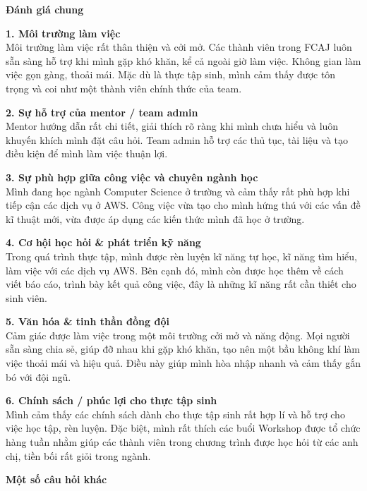 \vspace{0.5em}\noindent\textbf{Đánh giá chung}\par

\textbf{1. Môi trường làm việc}\\
Môi trường làm việc rất thân thiện và cởi mở. Các thành viên trong FCAJ
luôn sẵn sàng hỗ trợ khi mình gặp khó khăn, kể cả ngoài giờ làm việc.
Không gian làm việc gọn gàng, thoải mái. Mặc dù là thực tập sinh, mình
cảm thấy được tôn trọng và coi như một thành viên chính thức của team.

\textbf{2. Sự hỗ trợ của mentor / team admin}\\
Mentor hướng dẫn rất chi tiết, giải thích rõ ràng khi mình chưa hiểu và
luôn khuyến khích mình đặt câu hỏi. Team admin hỗ trợ các thủ tục, tài
liệu và tạo điều kiện để mình làm việc thuận lợi.

\textbf{3. Sự phù hợp giữa công việc và chuyên ngành học}\\
Mình đang học ngành Computer Science ở trường và cảm thấy rất phù hợp
khi tiếp cận các dịch vụ ở AWS. Công việc vừa tạo cho mình hứng thú với
các vấn đề kĩ thuật mới, vừa được áp dụng các kiến thức mình đã học ở
trường.

\textbf{4. Cơ hội học hỏi \& phát triển kỹ năng}\\
Trong quá trình thực tập, mình được rèn luyện kĩ năng tự học, kĩ năng
tìm hiểu, làm việc với các dịch vụ AWS. Bên cạnh đó, mình còn được học
thêm về cách viết báo cáo, trình bày kết quả công việc, đây là những kĩ
năng rất cần thiết cho sinh viên.

\textbf{5. Văn hóa \& tinh thần đồng đội}\\
Cảm giác được làm việc trong một môi trường cởi mở và năng động. Mọi
người sẵn sàng chia sẻ, giúp đỡ nhau khi gặp khó khăn, tạo nên một bầu
không khí làm việc thoải mái và hiệu quả. Điều này giúp mình hòa nhập
nhanh và cảm thấy gắn bó với đội ngũ.

\textbf{6. Chính sách / phúc lợi cho thực tập sinh}\\
Mình cảm thấy các chính sách dành cho thực tập sinh rất hợp lí và hỗ trợ
cho việc học tập, rèn luyện. Đặc biệt, mình rất thích các buổi Workshop
được tổ chức hàng tuần nhằm giúp các thành viên trong chương trình được
học hỏi từ các anh chị, tiền bối rất giỏi trong ngành.

\vspace{0.5em}\noindent\textbf{Một số câu hỏi
khác}\par

